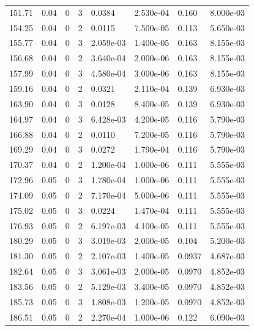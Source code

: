 \documentclass[preview]{standalone}
\begin{document}
{{{{\begin{tabular}{L{1.2cm}C{1.2cm} C{0.3cm}C{0.5cm} C{1.4cm}C{1.4cm} C{1.4cm}C{1.4cm}}
  151.71  &  0.04  & 0     &  3 &  0.0384  & 2.530e-04  & 0.160 &  8.000e-03   \\ 
  154.25  &  0.04  & 0     &  2 &  0.0115  & 7.500e-05  & 0.113 &  5.650e-03   \\ 
  155.77  &  0.04  & 0     &  3 &  2.059e-03  & 1.400e-05  & 0.163 &  8.155e-03   \\ 
  156.68  &  0.04  & 0     &  2 &  3.640e-04  & 2.000e-06  & 0.163 &  8.155e-03   \\ 
  157.99  &  0.04  & 0     &  3 &  4.580e-04  & 3.000e-06  & 0.163 &  8.155e-03   \\ 
  159.16  &  0.04  & 0     &  2 &  0.0321  & 2.110e-04  & 0.139 &  6.930e-03   \\ 
  163.90  &  0.04  & 0     &  3 &  0.0128  & 8.400e-05  & 0.139 &  6.930e-03   \\ 
  164.97  &  0.04  & 0     &  3 &  6.428e-03  & 4.200e-05  & 0.116 &  5.790e-03   \\ 
  166.88  &  0.04  & 0     &  2 &  0.0110  & 7.200e-05  & 0.116 &  5.790e-03   \\ 
  169.29  &  0.04  & 0     &  3 &  0.0272  & 1.790e-04  & 0.116 &  5.790e-03   \\ 
  170.37  &  0.04  & 0     &  2 &  1.200e-04  & 1.000e-06  & 0.111 &  5.555e-03   \\ 
  172.96  &  0.05  & 0     &  3 &  1.780e-04  & 1.000e-06  & 0.111 &  5.555e-03   \\ 
  174.09  &  0.05  & 0     &  2 &  7.170e-04  & 5.000e-06  & 0.111 &  5.555e-03   \\ 
  175.02  &  0.05  & 0     &  3 &  0.0224  & 1.470e-04  & 0.111 &  5.555e-03   \\ 
  176.93  &  0.05  & 0     &  2 &  6.197e-03  & 4.100e-05  & 0.111 &  5.555e-03   \\ 
  180.29  &  0.05  & 0     &  3 &  3.019e-03  & 2.000e-05  & 0.104 &  5.200e-03   \\ 
  181.30  &  0.05  & 0     &  2 &  2.107e-03  & 1.400e-05  & 0.0937 &  4.687e-03   \\ 
  182.64  &  0.05  & 0     &  3 &  3.061e-03  & 2.000e-05  & 0.0970 &  4.852e-03   \\ 
  183.56  &  0.05  & 0     &  2 &  5.129e-03  & 3.400e-05  & 0.0970 &  4.852e-03   \\ 
  185.73  &  0.05  & 0     &  3 &  1.808e-03  & 1.200e-05  & 0.0970 &  4.852e-03   \\ 
  186.51  &  0.05  & 0     &  2 &  2.270e-04  & 1.000e-06  & 0.122 &  6.090e-03   \\ 

\end{tabular}}}}}
\end{document}
